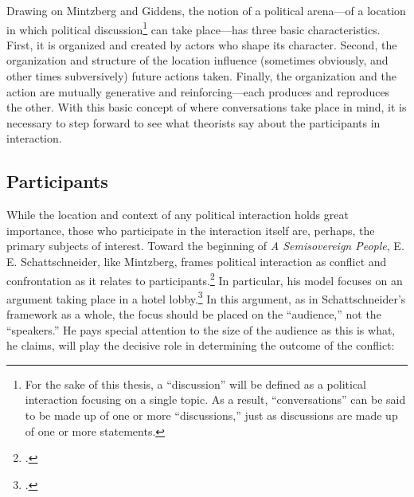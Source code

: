\documentclass[openany,twoside]{memoir}
\begin{document}
\begin{Spacing}{2}
Drawing on Mintzberg and Giddens, the notion of a political arena---of a location in which political discussion\footnote{
For the sake of this thesis, a ``discussion'' will be defined as a political interaction focusing on a single topic.
As a result, ``conversations'' can be said to be made up of one or more ``discussions,'' just as discussions are made up of one or more statements.}
can take place---has three basic characteristics.
First, it is organized and created by actors who shape its character.
Second, the organization and structure of the location influence (sometimes obviously, and other times subversively) future actions taken.
Finally, the organization and the action are mutually generative and reinforcing---each produces and reproduces the other.
With this basic concept of where conversations take place in mind, it is necessary to step forward to see what theorists say about the participants in interaction.

\subsection{Participants}
While the location and context of any political interaction holds great importance, those who participate in the interaction itself are, perhaps, the primary subjects of interest. 
Toward the beginning of \emph{A Semisovereign People}, E. E. Schattschneider, like Mintzberg, frames political interaction as conflict and confrontation as it relates to participants.\footcite{schattschneider75} 
In particular, his model focuses on an argument taking place in a hotel lobby.\footcite[1--5. Ironically, despite mentioning the location of the conflict, Schattschneider fails to discuss how the location may have affected the interaction.]{schattschneider75} 
In this argument, as in Schattschneider's framework as a whole, the focus should be placed on the ``audience,'' not the ``speakers.'' 
He pays special attention to the size of the audience as this is what, he claims, will play the decisive role in determining the outcome of the conflict: 
\end{Spacing}
\end{document}
